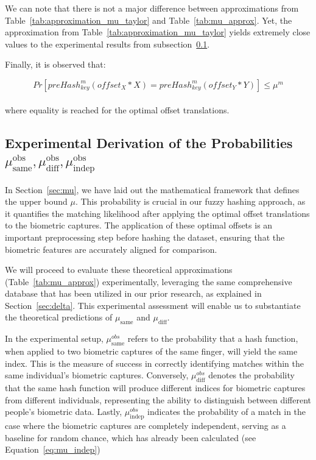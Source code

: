 We can note that there is not a major difference between approximations from Table~\ref{tab:approximation_mu_taylor} and Table~\ref{tab:mu_approx}. Yet, the approximation from Table~\ref{tab:approximation_mu_taylor} yields extremely close values to the experimental results from subsection~\ref{sec:experiment_fuzzy_hash}.

Finally, it is observed that:

\begin{equation}
    Pr[preHash_{key}^m(offset_X * X) = preHash_{key}^m(offset_Y * Y)] \leq \mu^m
\end{equation}
\\
where equality is reached for the optimal offset translations.

\subsection{Experimental Derivation of the Probabilities \(\mu_{\text{same}}^{\text{obs}}, \mu_{\text{diff}}^{\text{obs}}, \mu_{\text{indep}}^{\text{obs}}\)}
\label{sec:experiment_fuzzy_hash}

In Section~\ref{sec:mu}, we have laid out the mathematical framework that defines the upper bound \(\mu\). This probability is crucial in our fuzzy hashing approach, as it quantifies the matching likelihood after applying the optimal offset translations to the biometric captures. The application of these optimal offsets is an important preprocessing step before hashing the dataset, ensuring that the biometric features are accurately aligned for comparison.

We will proceed to evaluate these theoretical approximations (Table~\ref{tab:mu_approx}) experimentally, leveraging the same comprehensive database that has been utilized in our prior research, as explained in Section~\ref{sec:delta}. This experimental assessment will enable us to substantiate the theoretical predictions of \(\mu_{\text{same}}\) and \(\mu_{\text{diff}}\).

In the experimental setup, \(\mu^{obs}_{\text{same}}\) refers to the probability that a hash function, when applied to two biometric captures of the same finger, will yield the same index. This is the measure of success in correctly identifying matches within the same individual's biometric captures. Conversely, \(\mu^{obs}_{\text{diff}}\) denotes the probability that the same hash function will produce different indices for biometric captures from different individuals, representing the ability to distinguish between different people's biometric data. Lastly, \(\mu^{obs}_{\text{indep}}\) indicates the probability of a match in the case where the biometric captures are completely independent, serving as a baseline for random chance, which has already been calculated (see Equation~\ref{eq:mu_indep})

